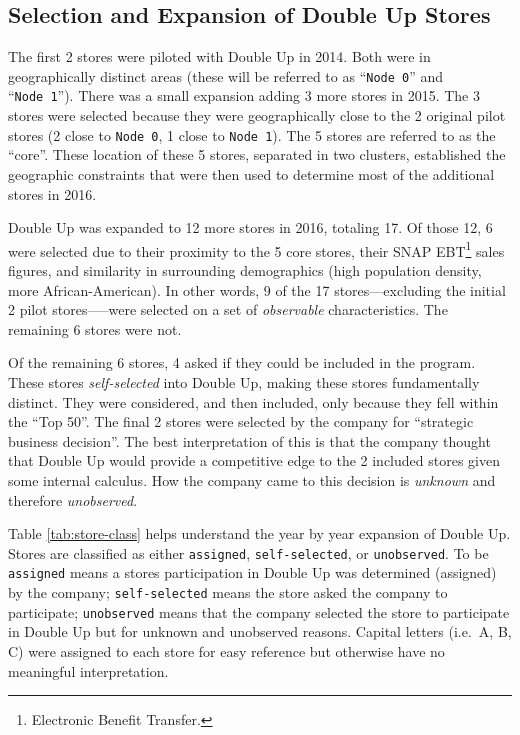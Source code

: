 \documentclass[12pt,letterpaperpaper,]{book}
\let\rmarkdownfootnote\footnote%
\def\footnote{\protect\rmarkdownfootnote}
\begin{document}
\subsection*{Selection and Expansion of Double Up
Stores}\label{selection-and-expansion-of-double-up-stores}

The first 2 stores were piloted with Double Up in 2014. Both were in
geographically distinct areas (these will be referred to as
``\texttt{Node\ 0}'' and ``\texttt{Node\ 1}''). There was a small
expansion adding 3 more stores in 2015. The 3 stores were selected
because they were geographically close to the 2 original pilot stores (2
close to \texttt{Node\ 0}, 1 close to \texttt{Node\ 1}). The 5 stores
are referred to as the ``core''. These location of these 5 stores,
separated in two clusters, established the geographic constraints that
were then used to determine most of the additional stores in 2016.

Double Up was expanded to 12 more stores in 2016, totaling 17. Of those
12, 6 were selected due to their proximity to the 5 core stores, their
SNAP EBT\footnote{Electronic Benefit Transfer.} sales figures, and
similarity in surrounding demographics (high population density, more
African-American). In other words, 9 of the 17 stores---excluding the
initial 2 pilot stores-----were selected on a set of \emph{observable}
characteristics. The remaining 6 stores were not.

Of the remaining 6 stores, 4 asked if they could be included in the
program. These stores \emph{self-selected} into Double Up, making these
stores fundamentally distinct. They were considered, and then included,
only because they fell within the ``Top 50''. The final 2 stores were
selected by the company for ``strategic business decision''. The best
interpretation of this is that the company thought that Double Up would
provide a competitive edge to the 2 included stores given some internal
calculus. How the company came to this decision is \emph{unknown} and
therefore \emph{unobserved}.

Table \ref{tab:store-class} helps understand the year by year expansion
of Double Up. Stores are classified as either \texttt{assigned},
\texttt{self-selected}, or \texttt{unobserved}. To be \texttt{assigned}
means a stores participation in Double Up was determined (assigned) by
the company; \texttt{self-selected} means the store asked the company to
participate; \texttt{unobserved} means that the company selected the
store to participate in Double Up but for unknown and unobserved
reasons. Capital letters (i.e.~A, B, C) were assigned to each store for
easy reference but otherwise have no meaningful interpretation.
\end{document}
